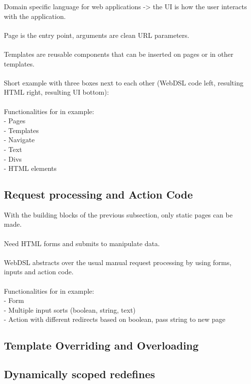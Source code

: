       Domain specific language for web applications -> the UI is how the user interacts with the application.
      \\\\Page is the entry point, arguments are clean URL parameters. \\\\Templates are reusable components that can be inserted on pages or in other templates.
      \\\\Short example with three boxes next to each other (WebDSL code left, resulting HTML right, resulting UI bottom):
      \\\\Functionalities for in example:
      \\- Pages
      \\- Templates
      \\- Navigate
      \\- Text
      \\- Divs
      \\- HTML elements

    \subsection{\label{subsec:request-processing}Request processing and Action Code}

      With the building blocks of the previous subsection, only static pages can be made.
      \\\\Need HTML forms and submits to manipulate data.
      \\\\WebDSL abstracts over the usual manual request processing by using forms, inputs and action code.
      \\\\Functionalities for in example:
      \\- Form
      \\- Multiple input sorts (boolean, string, text)
      \\- Action with different redirects based on boolean, pass string to new page

    \subsection{\label{subsec:template-overriding}Template Overriding and Overloading}

    \subsection{\label{subsec:redefines}Dynamically scoped redefines}

